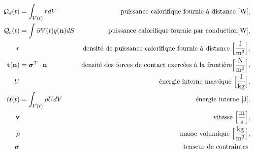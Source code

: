 \begin{align*}
    \mathcal{Q}_d(t) &= \int_{V(t)} r dV & \textrm{puissance calorifique fournie à distance } [\si{W}], \\
    \mathcal{Q}_c(t) &= \int{\partial V(t)} q(\vb{n}) dS & \textrm{puissance calorifique fournie par conduction} [\si{W}], \\
    r & & \textrm{densité de puissance calorifique fournie à distance } \Big[\si{\frac{J}{m^3}}\Big],\\
    \vb{t}(\vb{n}) &= \boldsymbol{\sigma}^T \cdot \vb{n} & \textrm{densité des forces de contact exercées à la frontière} \Big[\si{\frac{N}{m^2}}\Big],\\
    U & & \textrm{énergie interne massique } \Big[\si{\frac{J}{kg}}\Big],\\
    \mathcal{U}(t) &= \int_{V(t)} \rho U dV & \textrm{énergie interne } [\si{J}],\\
    \vb{v} & & \textrm{vitesse } \Big[\si{\frac{m}{s}}\Big],\\
    \rho & & \textrm{masse volumique } \Big[\si{\frac{kg}{m^3}}\Big],\\
    \boldsymbol{\sigma} & & \textrm{tenseur de contraintes }
  \end{align*}
  \endgroup
